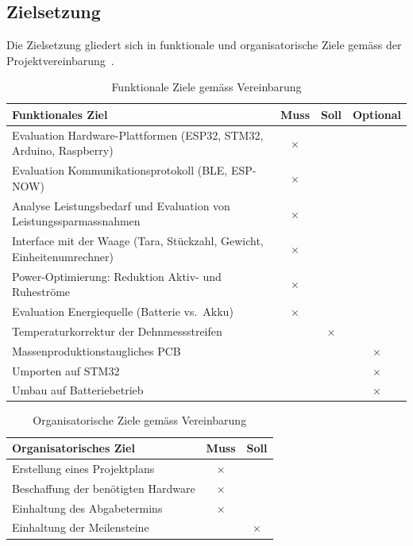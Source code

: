 \documentclass[12pt,a4paper]{article}
\begin{document}
	\subsection{Zielsetzung}

	Die Zielsetzung gliedert sich in funktionale und organisatorische Ziele gemäss der Projektvereinbarung~\cite{vereinbarung}.

	\begin{table}[H]
		\centering
		\caption{Funktionale Ziele gemäss Vereinbarung}
		\label{tab:ziele-funktional}
		\begin{tabular}{p{9.5cm}ccc}
			\toprule
			\textbf{Funktionales Ziel} & \textbf{Muss} & \textbf{Soll} & \textbf{Optional} \\
			\midrule
			Evaluation Hardware-Plattformen (ESP32, STM32, Arduino, Raspberry) & $\times$ & & \\
			Evaluation Kommunikationsprotokoll (BLE, ESP-NOW)                  & $\times$ & & \\
			Analyse Leistungsbedarf und Evaluation von Leistungssparmassnahmen & $\times$ & & \\
			Interface mit der Waage (Tara, Stückzahl, Gewicht, Einheitenumrechner) & $\times$ & & \\
			Power-Optimierung: Reduktion Aktiv- und Ruheströme                & $\times$ & & \\
			Evaluation Energiequelle (Batterie vs.\ Akku)                     & $\times$ & & \\
			Temperaturkorrektur der Dehnmessstreifen                          & & $\times$ & \\
			Massenproduktionstaugliches PCB                                     & & & $\times$ \\
			Umporten auf STM32                                                 & & & $\times$ \\
			Umbau auf Batteriebetrieb                                          & & & $\times$ \\
			\bottomrule
		\end{tabular}
	\end{table}

	\begin{table}[H]
		\centering
		\caption{Organisatorische Ziele gemäss Vereinbarung}
		\label{tab:ziele-org}
		\begin{tabular}{p{11cm}cc}
			\toprule
			\textbf{Organisatorisches Ziel} & \textbf{Muss} & \textbf{Soll} \\
			\midrule
			Erstellung eines Projektplans              & $\times$ & \\
			Beschaffung der benötigten Hardware        & $\times$ & \\
			Einhaltung des Abgabetermins               & $\times$ & \\
			Einhaltung der Meilensteine                & & $\times$ \\
			\bottomrule
		\end{tabular}
	\end{table}
\end{document}
